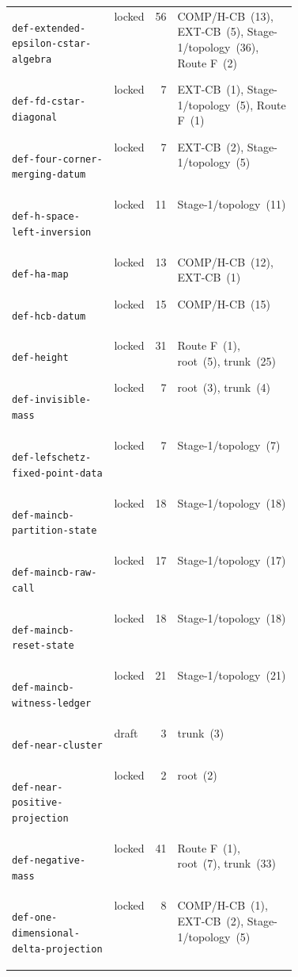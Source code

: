 \begin{longtable}{@{}l l r p{0.42\linewidth}@{}}
\hypertarget{dag:def-extended-epsilon-cstar-algebra}{}\texttt{def-extended-epsilon-cstar-algebra} & locked & 56 & COMP/H-CB~(13), EXT-CB~(5), Stage-1/topology~(36), Route F~(2) \\
\hypertarget{dag:def-fd-cstar-diagonal}{}\texttt{def-fd-cstar-diagonal} & locked & 7 & EXT-CB~(1), Stage-1/topology~(5), Route F~(1) \\
\hypertarget{dag:def-four-corner-merging-datum}{}\texttt{def-four-corner-merging-datum} & locked & 7 & EXT-CB~(2), Stage-1/topology~(5) \\
\hypertarget{dag:def-h-space-left-inversion}{}\texttt{def-h-space-left-inversion} & locked & 11 & Stage-1/topology~(11) \\
\hypertarget{dag:def-ha-map}{}\texttt{def-ha-map} & locked & 13 & COMP/H-CB~(12), EXT-CB~(1) \\
\hypertarget{dag:def-hcb-datum}{}\texttt{def-hcb-datum} & locked & 15 & COMP/H-CB~(15) \\
\hypertarget{dag:def-height}{}\texttt{def-height} & locked & 31 & Route F~(1), root~(5), trunk~(25) \\
\hypertarget{dag:def-invisible-mass}{}\texttt{def-invisible-mass} & locked & 7 & root~(3), trunk~(4) \\
\hypertarget{dag:def-lefschetz-fixed-point-data}{}\texttt{def-lefschetz-fixed-point-data} & locked & 7 & Stage-1/topology~(7) \\
\hypertarget{dag:def-maincb-partition-state}{}\texttt{def-maincb-partition-state} & locked & 18 & Stage-1/topology~(18) \\
\hypertarget{dag:def-maincb-raw-call}{}\texttt{def-maincb-raw-call} & locked & 17 & Stage-1/topology~(17) \\
\hypertarget{dag:def-maincb-reset-state}{}\texttt{def-maincb-reset-state} & locked & 18 & Stage-1/topology~(18) \\
\hypertarget{dag:def-maincb-witness-ledger}{}\texttt{def-maincb-witness-ledger} & locked & 21 & Stage-1/topology~(21) \\
\hypertarget{dag:def-near-cluster}{}\texttt{def-near-cluster} & draft & 3 & trunk~(3) \\
\hypertarget{dag:def-near-positive-projection}{}\texttt{def-near-positive-projection} & locked & 2 & root~(2) \\
\hypertarget{dag:def-negative-mass}{}\texttt{def-negative-mass} & locked & 41 & Route F~(1), root~(7), trunk~(33) \\
\hypertarget{dag:def-one-dimensional-delta-projection}{}\texttt{def-one-dimensional-delta-projection} & locked & 8 & COMP/H-CB~(1), EXT-CB~(2), Stage-1/topology~(5) \\

\end{longtable}
